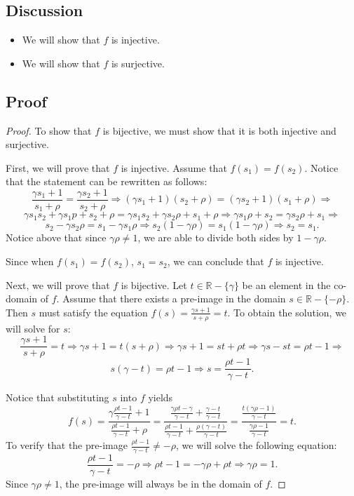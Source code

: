 \documentclass{article}
\begin{document}
\subsection*{Discussion}
\begin{itemize}
    \item We will show that $ f $ is injective.
    \item We will show that $ f $ is surjective.
\end{itemize}

\subsection*{Proof}
\begin{proof}
    To show that $ f $ is bijective, we must show that it is both injective and surjective.

    \noindent First, we will prove that $ f $ is injective. Assume that $ f(s_1) = f(s_2) $. Notice that the statement can be rewritten as follows:
    \[
        \frac{\gamma s_1 + 1}{s_1 + \rho} = \frac{\gamma s_2 + 1}{s_2 + \rho} \Rightarrow (\gamma s_1 + 1)(s_2 + \rho) = (\gamma s_2 + 1)(s_1 + \rho) \Rightarrow
    \]
    \[
        \gamma s_1 s_2 + \gamma s_1 p + s_2 + \rho = \gamma s_1 s_2 + \gamma s_2 \rho + s_1 + \rho \Rightarrow \gamma s_1 \rho + s_2 = \gamma s_2 \rho + s_1 \Rightarrow
    \]
    \[
        s_2 - \gamma s_2 \rho = s_1 - \gamma s_1 \rho \Rightarrow  s_2 (1 - \gamma \rho) = s_1 (1 - \gamma \rho) \Rightarrow s_2 = s_1.
    \]
    Notice above that since $ \gamma \rho \neq 1 $, we are able to divide both sides by $ 1 - \gamma \rho $.
    
    \noindent Since when $ f(s_1) = f(s_2) $, $ s_1 = s_2 $, we can conclude that $ f $ is injective.

    \noindent Next, we will prove that $ f $ is bijective. Let $ t \in \mathbb{R}-\{\gamma\} $ be an element in the co-domain of $ f $. Assume that there exists a pre-image in the domain $ s \in \mathbb{R}-\{-\rho\} $.
    Then $ s $ must satisfy the equation $ f(s) = \frac{\gamma s + 1}{s + \rho} = t $. To obtain the solution, we will solve for $ s $:
    \[
        \frac{\gamma s + 1}{s + \rho} = t \Rightarrow \gamma s + 1 = t (s + \rho) \Rightarrow \gamma s + 1 = st + \rho t \Rightarrow \gamma s - st = \rho t - 1 \Rightarrow
    \]
    \[
        s (\gamma - t) = \rho t - 1 \Rightarrow s = \frac{\rho t - 1}{\gamma - t}.
    \]
    
    \noindent Notice that substituting $ s $ into $ f $ yields
    \[
        f(s) = \frac{\gamma \frac{\rho t - 1}{\gamma - t} + 1}{\frac{\rho t - 1}{\gamma - t} + \rho} = \frac{\frac{\gamma \rho t - \gamma}{\gamma - t} + \frac{\gamma - t}{\gamma - t}}{\frac{\rho t - 1}{\gamma - t} + \frac{\rho (\gamma - t)}{\gamma - t}} = \frac{\frac{t (\gamma \rho - 1)}{\gamma - t}}{\frac{\gamma \rho - 1}{\gamma - t}} = t.
    \]
    To verify that the pre-image $ \frac{\rho t - 1}{\gamma - t} \neq -\rho $, we will solve the following equation:
    \[
        \frac{\rho t - 1}{\gamma - t} = -\rho \Rightarrow \rho t - 1 = -\gamma \rho + \rho t \Rightarrow \gamma \rho = 1.
    \]
    Since $ \gamma \rho \neq 1 $, the pre-image will always be in the domain of $ f $.


\end{proof}
\end{document}
